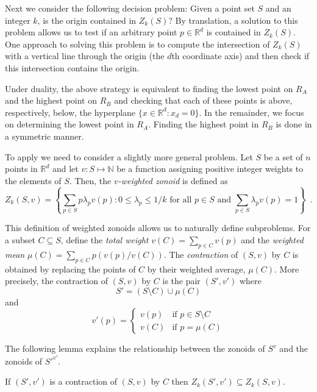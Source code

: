 \documentclass[lotsofwhite]{patmorin}
\newcommand{\R}{\mathbb{R}}
\begin{document}
Next we consider the following decision problem:  Given a point set
$S$ and an integer $k$, is the origin contained in $Z_k(S)$?  By
translation, a solution to this problem allows us to test if an
arbitrary point $p\in\R^d$ is contained in $Z_k(S)$. One
approach to solving this problem is to compute the intersection of
$Z_k(S)$ with a vertical line through the origin (the $d$th coordinate
axis) and then check if this intersection contains the origin. 

Under duality, the above strategy is equivalent to finding the lowest
point on $R_A$ and the highest point on $R_B$ and checking that each
of these points is above, respectively, below, the hyperplane
$\{x\in\R^d:x_d=0\}$.
In the remainder, we focus on determining the lowest point in $R_A$.
Finding the highest point in $R_B$ is done in a symmetric manner.  

To apply  we need to consider a slightly more general
problem.  Let $S$ be a set of $n$ points in $\R^d$ and let
$v:S\mapsto\mathbb{N}$ be a function assigning positive integer
weights to the elements of $S$.  Then, the \emph{$v$-weighted zonoid}
\cite{gmXX} is defined as
\[
      Z_k(S,v) = \left\{\sum_{p\in S}p\lambda_pv(p)
	: \mbox{$0\le \lambda_p \le 1/k$ for all $p\in S$  
	   and $\sum_{p\in S}\lambda_pv(p) = 1$}  \right\} \enspace .
\]

This definition of weighted zonoids
allows us to naturally define subproblems.
For a subset $C\subseteq S$, define the \emph{total weight}
$v(C)=\sum_{p\in C}v(p)$ and the \emph{weighted mean}
$\mu(C)=\sum_{p\in C} p(v(p)/v(C))$.  The \emph{contraction} of
$(S,v)$ by $C$ is obtained by replacing the points of $C$ by their
weighted average, $\mu(C)$.  More precisely, the contraction of
$(S,v)$ by $C$ is the pair $(S',v')$ where 
\[ S' = (S\setminus C) \cup \mu(C) \] 
and 
\[ v'(p) = \left\{\begin{array}{ll} 
        v(p) & \mbox{if $p\in S\setminus C$} \\ 
        v(C) & \mbox{if $p=\mu(C)$} \end{array}\right.
\]

The following lemma explains the relationship between the zonoids of
$S^v$ and the zonoids of $S'^{v'}$.

\begin{lem}
If $(S',v')$ is a contraction of $(S,v)$ by $C$ then $Z_k(S',v')
\subseteq Z_k(S,v)$.
\end{lem}
\end{document}
